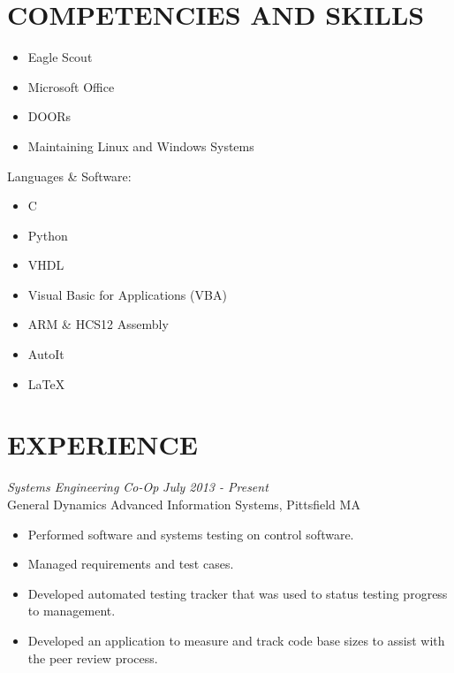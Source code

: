 \documentclass[line,margin]{res}
\begin{document}
\begin{resume}
\section{COMPETENCIES AND SKILLS} 
		\begin{multicols}{2}
			\begin{itemize}
				\itemsep -2pt
				\item[] Eagle Scout
				\item[] Microsoft Office
				\item[] DOORs
				\item[] Maintaining Linux and Windows Systems

			\end{itemize}
		\end{multicols}
	\vspace{-10pt}
	{Languages \& Software:} %
		\begin{multicols}{2}
			\begin{itemize}
				\itemsep -2pt
				\item[] C
				\item[] Python
				\item[] VHDL
				\item[] Visual Basic for Applications (VBA)
				\item[] ARM \& HCS12 Assembly
				\item[] AutoIt
				\item[] \LaTeX 
			\end{itemize}
		\end{multicols}
\section{EXPERIENCE} 
{\sl Systems Engineering Co-Op} \hfill {\sl July 2013 - Present }\\
	General Dynamics Advanced Information Systems, Pittsfield MA
	\begin{itemize}  \itemsep -2pt %
			\item Performed software and systems testing on 
				control software. 
			\item Managed requirements and test cases.
			\item Developed automated testing tracker
				that was used to status testing progress
				to management. 
			\item Developed an application to measure and track 
				code base sizes to assist with the peer review process.
	\end{itemize}
 

\end{resume}
\end{document}
